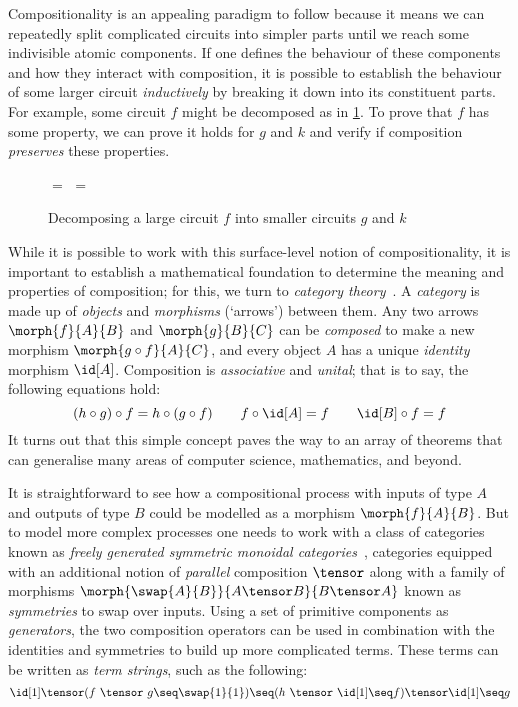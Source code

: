 Compositionality is an appealing paradigm to follow because it means we can
repeatedly split complicated circuits into simpler parts until we reach some
indivisible atomic components.
If one defines the behaviour of these components and how they interact
with composition, it is possible to establish the behaviour of some
larger circuit \emph{inductively} by breaking it down into its constituent
parts.
For example, some circuit \(f\) might be decomposed as in
\cref{fig:decomposition}.
To prove that \(f\) has some property, we can prove it holds for \(g\) and \(k\)
and verify if composition \emph{preserves} these properties.

\begin{figure}
    \centering
    \(=\)
    \(=\)
    \caption{
        Decomposing a large circuit \(f\) into smaller circuits \(g\)
        and \(k\)
    }
    \label{fig:decomposition}
\end{figure}

While it is possible to work with this surface-level notion of
compositionality, it is important to establish a mathematical
foundation to determine the meaning and properties of composition; for this, we
turn to \emph{category theory}~\cite{maclane1978categories}.
A \emph{category} is made up of \emph{objects} and \emph{morphisms} (`arrows')
between them.
Any two arrows \(\morph{f}{A}{B}\) and \(\morph{g}{B}{C}\) can be
\emph{composed} to  make a new morphism \(\morph{g \circ f}{A}{C}\), and every
object \(A\) has a unique \emph{identity} morphism \(\id[A]\).
Composition is \emph{associative} and \emph{unital}; that is to say, the
following equations hold:
\[
    (h \circ g) \circ f = h \circ (g \circ f)
    \qquad
    f \circ \id[A] = f
    \qquad
    \id[B] \circ f = f
\]
It turns out that this simple concept paves the way to an array of
theorems that can generalise many areas of computer science, mathematics, and
beyond.

It is straightforward to see how a compositional process with inputs of type
\(A\) and outputs of type \(B\) could be modelled as a morphism
\(\morph{f}{A}{B}\).
But to model more complex processes one needs to work with a class of categories
known as
\emph{freely generated symmetric monoidal categories}~\cite{maclane1963natural},
categories equipped with an additional notion of \emph{parallel} composition
\(\tensor\) along with a family of morphisms
\(\morph{\swap{A}{B}}{A\tensor B}{B \tensor A}\) known as \emph{symmetries} to
swap over inputs.
Using a set of primitive components as \emph{generators}, the two composition
operators can be used in combination with the identities and symmetries to build
up more complicated terms.
These terms can be written as \emph{term strings}, such as the following:
\[
    \id[1]
    \tensor
    (f\ \tensor\ g
    \seq
    \swap{1}{1}
    )
    \seq
    (h\ \tensor\ \id[1] \seq f)
    \tensor
    \id[1]
    \seq
    g
\]

